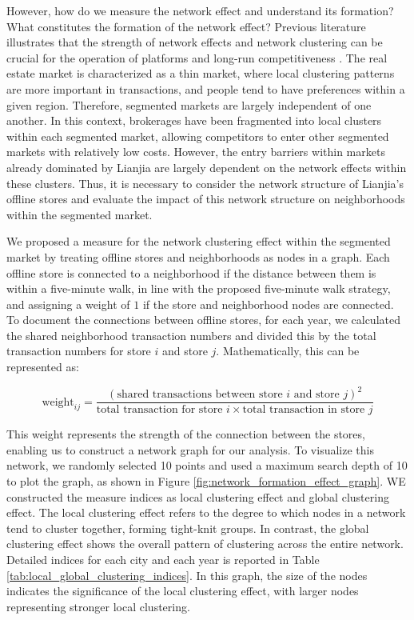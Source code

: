 \documentclass[11pt]{article}
\begin{document}
However, how do we measure the network effect and understand its formation? What constitutes the formation of the network effect? Previous literature illustrates that the strength of network effects and network clustering can be crucial for the operation of platforms and long-run competitiveness \citep{WOS:000454186600016}. The real estate market is characterized as a thin market, where local clustering patterns are more important in transactions, and people tend to have preferences within a given region. Therefore, segmented markets are largely independent of one another. In this context, brokerages have been fragmented into local clusters within each segmented market, allowing competitors to enter other segmented markets with relatively low costs. However, the entry barriers within markets already dominated by Lianjia are largely dependent on the network effects within these clusters. Thus, it is necessary to consider the network structure of Lianjia's offline stores and evaluate the impact of this network structure on neighborhoods within the segmented market.

We proposed a measure for the network clustering effect within the segmented market by treating offline stores and neighborhoods as nodes in a graph. Each offline store is connected to a neighborhood if the distance between them is within a five-minute walk, in line with the proposed five-minute walk strategy, and assigning a weight of $1$ if the store and neighborhood nodes are connected. To document the connections between offline stores, for each year, we calculated the shared neighborhood transaction numbers and divided this by the total transaction numbers for store $i$ and store $j$. Mathematically, this can be represented as:

\begin{equation}
  \text{weight}_{ij} = \frac{(\text{shared transactions between store $i$ and store $j$})^2}{\text{total transaction for store $i$} \times \text{total transaction in store $j$}} \label{eq:weight_between_stores}
\end{equation}

This weight represents the strength of the connection between the stores, enabling us to construct a network graph for our analysis. To visualize this network, we randomly selected 10 points and used a maximum search depth of 10 to plot the graph, as shown in Figure \ref{fig:network_formation_effect_graph}. WE constructed the measure indices as local clustering effect and global clustering effect. The local clustering effect refers to the degree to which nodes in a network tend to cluster together, forming tight-knit groups. In contrast, the global clustering effect shows the overall pattern of clustering across the entire network. Detailed indices for each city and each year is reported in Table \ref{tab:local_global_clustering_indices}. In this graph, the size of the nodes indicates the significance of the local clustering effect, with larger nodes representing stronger local clustering. 
\end{document}
